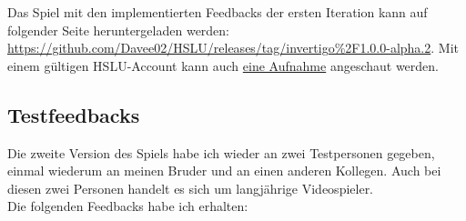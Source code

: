 \documentclass{article}
\begin{document}
Das Spiel mit den implementierten Feedbacks der ersten Iteration kann auf folgender Seite heruntergeladen werden: \url{https://github.com/Davee02/HSLU/releases/tag/invertigo%2F1.0.0-alpha.2}.
Mit einem gültigen HSLU-Account kann auch \href{https://hsluzern-my.sharepoint.com/:v:/g/personal/david_hodel_stud_hslu_ch/EcKRx5NXzzFCiwn0xVOLA04BylXdBGg6la7ceVz9dLMMdA?nav=eyJyZWZlcnJhbEluZm8iOnsicmVmZXJyYWxBcHAiOiJPbmVEcml2ZUZvckJ1c2luZXNzIiwicmVmZXJyYWxBcHBQbGF0Zm9ybSI6IldlYiIsInJlZmVycmFsTW9kZSI6InZpZXciLCJyZWZlcnJhbFZpZXciOiJNeUZpbGVzTGlua0NvcHkifX0&e=h7Vkq7}{eine Aufnahme}
angeschaut werden.

\subsection{Testfeedbacks}

Die zweite Version des Spiels habe ich wieder an zwei Testpersonen gegeben, einmal wiederum an meinen Bruder und an einen anderen Kollegen.
Auch bei diesen zwei Personen handelt es sich um langjährige Videospieler.
\\
Die folgenden Feedbacks habe ich erhalten:
\end{document}
